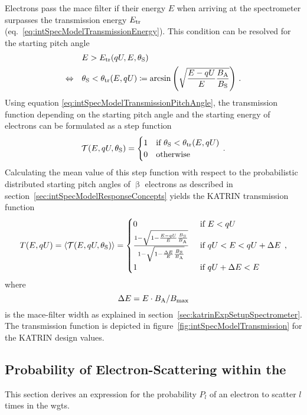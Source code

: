 Electrons pass the \gls{mace} filter if their energy $E$ when arriving at the spectrometer surpasses the transmission energy $E_\mathrm{tr}$ (eq.~\ref{eq:intSpecModelTransmissionEnergy}). This condition can be resolved for the starting pitch angle~\cite{Groh2015}
\begin{align}
&E > E_\mathrm{tr}(qU,E,\theta_\mathrm{S}) \nonumber \\
\Leftrightarrow \quad
& \theta_\mathrm{S} < \theta_\mathrm{tr}(E,qU)
\coloneqq
\arcsin
\left(\sqrt{
	\frac{E-qU}{E} 
	\frac{B_\mathrm{A}}{B_\mathrm{S}}
}\right)
\text{\,.}
\label{eq:intSpecModelTransmissionPitchAngle}
\end{align}
Using equation \eqref{eq:intSpecModelTransmissionPitchAngle}, the transmission function depending on the starting pitch angle and the starting energy of electrons can be formulated as a step function
\begin{equation}
\label{eq:intSpecModelTransmissionStep}
\mathcal{T}(E, qU, \theta_\mathrm{S}) =
\begin{cases}
1 & \text{if } \theta_\mathrm{S} < \theta_\mathrm{tr}(E,qU) \\
0 & \text{otherwise} 
\end{cases}
\text{\,.}
\end{equation}
Calculating the mean value of this step function with respect to the probabilistic distributed starting pitch angles of $\upbeta$ electrons as described in section~\ref{sec:intSpecModelResponseConcepts} yields the KATRIN transmission function~\cite{Angrik:2005ep}
\begin{equation}
\label{eq:intSpecModelTransmission}
	T(E, qU) = 
	\left\langle{\mathcal{T}(E, qU, \theta_\mathrm{S})}\right\rangle =
	\begin{cases}
	0 & \text{ if } E < qU \\
	\frac{
		1-\sqrt{
			1-\frac{E-qU}{E} 
			\frac{B_\mathrm{S}}{B_\mathrm{A}}
		} 
	}{
		1-\sqrt{1-\frac{\Delta E}{E}\frac{B_\mathrm{S}}{B_\mathrm{A}}}
	}
	& \text{ if } qU < E < qU + \Delta E \\
	1 & \text{ if } qU + \Delta E < E
	\end{cases}
	\text{\,,}
\end{equation}
where 
\begin{equation}
	\label{eq:intSpecModelTransmissionMACEFilterWidth}
	\Delta E=E\cdot B_\mathrm{A}/B_\mathrm{max}
\end{equation}
is the \gls{mace}-filter width as explained in section~\ref{sec:katrinExpSetupSpectrometer}. The transmission function is depicted in figure~\ref{fig:intSpecModelTransmission} for the KATRIN design values.

\subsection{Probability of Electron-Scattering within the }
\label{sec:intSpecModelResponseScattering}
This section derives an expression for the probability $P_l$ of an electron to scatter $l$ times in the \gls{wgts}.

